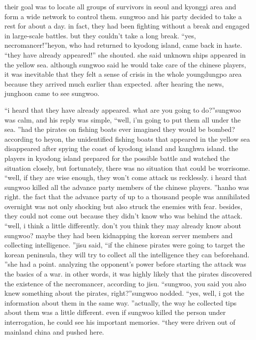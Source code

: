 their goal was to locate all groups of survivors in seoul and kyonggi area and form a wide network to control them.
sungwoo and his party decided to take a rest for about a day.
 in fact, they had been fighting without a break and engaged in large-scale battles.
but they couldn’t take a long break.
“yes, necromancer!”heyon, who had returned to kyodong island, came back in haste.
“they have already appeared!” she shouted.
she said unknown ships appeared in the yellow sea.
although sungwoo said he would take care of the chinese players, it was inevitable that they felt a sense of crisis in the whole youngdungpo area because they arrived much earlier than expected.
after hearing the news, junghoon came to see sungwoo.


“i heard that they have already appeared.
 what are you going to do?”sungwoo was calm, and his reply was simple, “well, i’m going to put them all under the sea.
”had the pirates on fishing boats ever imagined they would be bombed?according to heyon, the unidentified fishing boats that appeared in the yellow sea disappeared after spying the coast of kyodong island and kanghwa island.
the players in kyodong island prepared for the possible battle and watched the situation closely, but fortunately, there was no situation that could be worrisome.
“well, if they are wise enough, they won’t come attack us recklessly.
 i heard that sungwoo killed all the advance party members of the chinese players.
”hanho was right.
 the fact that the advance party of up to a thousand people was annihilated overnight was not only shocking but also struck the enemies with fear.
 besides, they could not come out because they didn’t know who was behind the attack.
“well, i think a little differently.
 don’t you think they may already know about sungwoo? maybe they had been kidnapping the korean server members and collecting intelligence.
”jisu said, “if the chinese pirates were going to target the korean peninsula, they will try to collect all the intelligence they can beforehand.
”she had a point.
 analyzing the opponent’s power before starting the attack was the basics of a war.
 in other words, it was highly likely that the pirates discovered the existence of the necromancer, according to jisu.
“sungwoo, you said you also knew something about the pirates, right?”sungwoo nodded.
“yes, well, i got the information about them in the same way.
”actually, the way he collected tips about them was a little different.
 even if sungwoo killed the person under interrogation, he could see his important memories.
“they were driven out of mainland china and pushed here.
